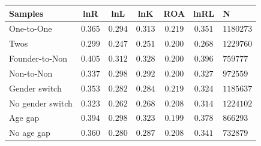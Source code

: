 \begin{tabular}{l*{5}{c}}
\hline\hline
Samples & lnR & lnL & lnK & ROA & lnRL & N \\
\hline
One-to-One & $0.365$ & $0.294$ & $0.313$ & $0.219$ & $0.351$ & $1180273$ \\
Twos & $0.299$ & $0.247$ & $0.251$ & $0.200$ & $0.268$ & $1229760$ \\
Founder-to-Non & $0.405$ & $0.312$ & $0.328$ & $0.200$ & $0.396$ & $759777$ \\
Non-to-Non & $0.337$ & $0.298$ & $0.292$ & $0.200$ & $0.327$ & $972559$ \\
Gender switch & $0.353$ & $0.282$ & $0.284$ & $0.219$ & $0.324$ & $1185637$ \\
No gender switch & $0.323$ & $0.262$ & $0.268$ & $0.208$ & $0.314$ & $1224102$ \\
Age gap & $0.394$ & $0.298$ & $0.323$ & $0.199$ & $0.378$ & $866293$ \\
No age gap & $0.360$ & $0.280$ & $0.287$ & $0.208$ & $0.341$ & $732879$ \\
\hline\hline
\end{tabular}
